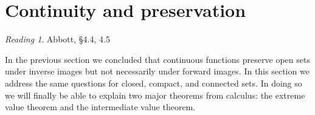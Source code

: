\documentclass[11pt,oneside]{amsbook}
\newcommand{\set}[1]{\left\{\,#1\,\right\}}
\theoremstyle{definition}
\newtheorem{exerc}{Exercise}[section]
\theoremstyle{plain}
\theoremstyle{definition}
\theoremstyle{remark}
\newtheorem*{reading}{Reading}
\numberwithin{equation}{section}
\numberwithin{figure}{section}
\begin{document}
  

%

\newpage
\section{Continuity and preservation}

\begin{reading}
  Abbott, \S 4.4, 4.5
\end{reading}

In the previous section we concluded that continuous functions preserve open sets under inverse images but not necessarily under forward images. In this section we address the same questions for closed, compact, and connected sets. In doing so we will finally be able to explain two major theorems from calculus: the extreme value theorem and the intermediate value theorem.
\end{document}
